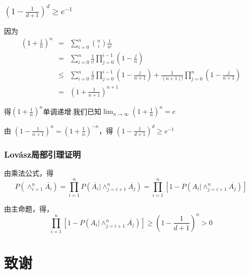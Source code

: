 \documentclass[AutoFakeBold]{beamer}
\begin{document}
{\begin{frame}
    \end{frame}

    \begin{frame}
        \frametitle{$(1 - \frac{1}{d+1})^d\ge e^{-1}$}
        因为
        \begin{eqnarray*} 
        (1 + \frac{1}{n})^n &=& \sum_{i=0}^{n}\binom{n}{i}\frac{1}{n^i}\\&=& \sum_{i=0}^{n}\frac{1}{i!} \prod_{j=0}^{i-1}(1 - \frac{j}{n}) \\  &\le&\sum_{i=0}^{n} \frac{1}{i!}\prod_{j=0}^{i-1}(1 - \frac{j}{n+1}) + \frac{1}{(n+1)!}\prod_{j=0}^{n}(1-\frac{j}{n+1})\\ &=& (1+\frac{1}{n+1})^{n+1}
        \end{eqnarray*}

        得$(1 + \frac{1}{n})^n$单调递增.我们已知$\lim_{n \to \infty}(1 + \frac{1}{n})^n = e$

        由 $(1 - \frac{1}{n+1})^n = (1+\frac{1}{n})^{-n}$，得 $(1 - \frac{1}{d+1})^d\ge e^{-1}$
    \end{frame}

    \begin{frame}
        \frametitle{Lovász局部引理证明}
    
        由乘法公式，得
        $$P(\wedge_{i=1}^{n}\overline{A_i}) = \prod_{i=1}^{n}P(\overline{A_i}|\wedge_{j=i+1}^{n}\overline{A_j})=\prod_{i=1}^{n}[1 -  P(A_i|\wedge_{j=i+1}^{n}\overline{A_j})]$$

        由主命题，得，$$\prod_{i=1}^{n}[1 -  P(A_i|\wedge_{j=i+1}^{n}\overline{A_j})] \ge (1 - \frac{1}{d+1})^n>0$$

    
    \end{frame}
    
    \section*{致谢}

}
\end{document}
